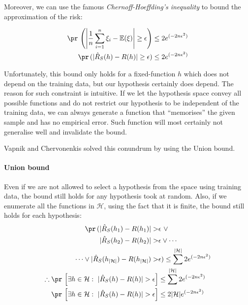 \documentclass[
  letterpaper,
  12pt,
  british]{tufte-book}
\let\oldparagraph\paragraph
\renewcommand{\paragraph}[1]{\oldparagraph{#1}\mbox{}}
\theoremstyle{plain}
\theoremstyle{definition}
\theoremstyle{plain}
\theoremstyle{remark}
\begin{document}
Moreover, we can use the famous \emph{Chernoff-Hoeffding's inequality}
to bound the approximation of the risk:

\begin{align}
\pr\,\left(\Bigg | \frac{1}{n} \sum_{i=1}^{n}\xi_i - \mathbb{E}(\xi) \Bigg | \geq \epsilon \right) &\leq 2 e^{(-2n\epsilon^2)} \\
 \pr\,(|\hat{R}_{S}(h) - R(h)| \geq \epsilon) &\leq 2 e^{(-2n\epsilon^2)}
\end{align}

Unfortunately, this bound only holds for a fixed-function \(h\) which
does not depend on the training data, but our hypothesis certainly does
depend. The reason for such constraint is intuitive. If we let the
hypothesis space convey all possible functions and do not restrict our
hypothesis to be independent of the training data, we can always
generate a function that ``memorises'' the given sample and has no
empirical error. Such function will most certainly not generalise well
and invalidate the bound.

Vapnik and Chervonenkis solved this conundrum by using the Union bound.

\hypertarget{union-bound}{%
\paragraph{Union bound}\label{union-bound}}

Even if we are not allowed to select a hypothesis from the space using
training data, the bound still holds for any hypothesis took at random.
Also, if we enumerate all the functions in \(\mathcal{H}\), using the
fact that it is finite, the bound still holds for each hypothesis:
\begin{align}
    \pr\,(|\hat{R}_{S}(h_1) - R(h_1) | > &\epsilon~  \lor \nonumber \\
    |\hat{R}_{S}(h_2)-R(h_2)| > &\epsilon  \lor \cdots \nonumber \\
    \cdots \lor  |\hat{R}_{S}(h_{|\mathcal{H}|})-R(h_{|\mathcal{H}|}) > &\epsilon) \leq \sum^{|\mathcal{H}|} 2 e^{(-2n\epsilon^2)}\\    \therefore \pr\,\left[ \exists h \in \mathcal{H}:~|\hat{R}_{S}(h) - R(h)| >\epsilon\right] &\leq \sum^{|\mathcal{H}|} 2 e^{(-2n\epsilon^2)} \\
    \pr\,\left[ \exists h \in \mathcal{H}:~|\hat{R}_{S}(h) - R(h)| >\epsilon\right] &\leq 2 |\mathcal{H}| e^{(-2n\epsilon^2)}
\label{eq:union_bound} 
\end{align}
\end{document}
